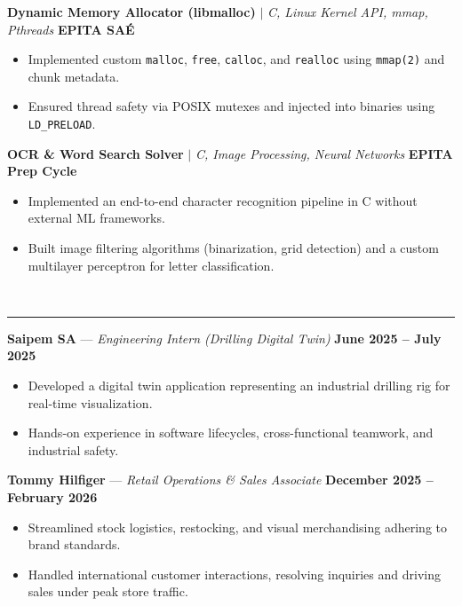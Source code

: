 \documentclass[10pt, a4paper]{article}
\newcommand{\resumesection}[1]{%
  \vspace{7pt}%
  \noindent{\large\textbf{\uppercase{#1}}}\\[-6pt]%
  \noindent\rule{\textwidth}{0.5pt}%
  \vspace{3pt}%
}
\begin{document}
\noindent \textbf{Dynamic Memory Allocator (libmalloc)} $|$ \textit{C, Linux Kernel API, mmap, Pthreads} \hfill \textbf{EPITA SAÉ}
\begin{itemize}
  \setlength{\itemsep}{1pt}
  \setlength{\parskip}{0pt}
  \item Implemented custom \texttt{malloc}, \texttt{free}, \texttt{calloc}, and \texttt{realloc} using \texttt{mmap(2)} and chunk metadata.
  \item Ensured thread safety via POSIX mutexes and injected into binaries using \texttt{LD\_PRELOAD}.
\end{itemize}

\noindent \textbf{OCR \& Word Search Solver} $|$ \textit{C, Image Processing, Neural Networks} \hfill \textbf{EPITA Prep Cycle}
\begin{itemize}
  \setlength{\itemsep}{1pt}
  \setlength{\parskip}{0pt}
  \item Implemented an end-to-end character recognition pipeline in C without external ML frameworks.
  \item Built image filtering algorithms (binarization, grid detection) and a custom multilayer perceptron for letter classification.
\end{itemize}

\resumesection{Professional Experience}

\noindent \textbf{Saipem SA} --- \textit{Engineering Intern (Drilling Digital Twin)} \hfill \textbf{June 2025 -- July 2025}
\begin{itemize}
  \setlength{\itemsep}{1pt}
  \setlength{\parskip}{0pt}
  \item Developed a digital twin application representing an industrial drilling rig for real-time visualization.
  \item Hands-on experience in software lifecycles, cross-functional teamwork, and industrial safety.
\end{itemize}

\noindent \textbf{Tommy Hilfiger} --- \textit{Retail Operations \& Sales Associate} \hfill \textbf{December 2025 -- February 2026}
\begin{itemize}
  \setlength{\itemsep}{1pt}
  \setlength{\parskip}{0pt}
  \item Streamlined stock logistics, restocking, and visual merchandising adhering to brand standards.
  \item Handled international customer interactions, resolving inquiries and driving sales under peak store traffic.
\end{itemize}
\end{document}
